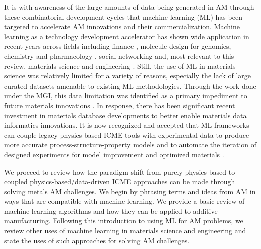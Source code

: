 It is with awareness of the large amounts of data being generated in AM through these combinatorial development cycles that machine learning (ML) has been targeted to accelerate AM innovations and their commercialization. Machine learning as a technology development accelerator has shown wide application in recent years across fields including finance \cite{Bose2001}, molecule design for genomics, chemistry and pharmacology \cite{Gomez-Bombarelli2018}, social networking \cite{Brusilovsky2007} and, most relevant to this review, materials science and engineering \cite{Wagner2016, Ramprasad2017, Butler2018}. Still, the use of ML in materials science was relatively limited for a variety of reasons, especially the lack of large curated datasets amenable to existing ML methodologies. Through the work done under the MGI, this data limitation was identified as a primary impediment to future materials innovations \cite{MGI}. In response, there has been significant recent investment in materials database developments to better enable materials data informatics innovations. It is now recognized and accepted that ML frameworks can couple legacy physics-based ICME tools with experimental data to produce more accurate process-structure-property models and to automate the iteration of designed experiments for model improvement and optimized materials \cite{Rajan2005, Agrawal2016, Butler2018, Ball2019, Druzgalski2020}.

We proceed to review how the paradigm shift from purely physics-based to coupled physics-based/data-driven ICME approaches can be made through solving metals AM challenges. We begin by phrasing terms and ideas from AM in ways that are compatible with machine learning. We provide a basic review of machine learning algorithms and how they can be applied to additive manufacturing. Following this introduction to using ML for AM problems, we review other uses of machine learning in materials science and engineering and state the uses of such approaches for solving AM challenges. 
